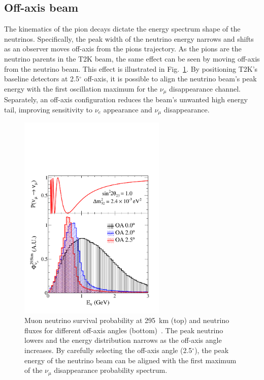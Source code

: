 \subsection{Off-axis beam}
\label{subsec:OffAxisBeam}
The kinematics of the pion decays dictate the energy spectrum shape of the neutrinos.  Specifically, the peak width of the neutrino energy narrows and shifts as an observer moves off-axis from the pions trajectory.  As the pions are the neutrino parents in the T2K beam, the same effect can be seen by moving off-axis from the neutrino beam.  This effect is illustrated in Fig.~\ref{fig:OAEffectFlux}.  By positioning T2K's baseline detectors at 2.5$^\circ$ off-axis, it is possible to align the neutrino beam's peak energy with the first oscillation maximum for the $\nu_\mu$ disappearance channel.  Separately, an off-axis configuration reduces the beam's unwanted high energy tail, improving sensitivity to $\nu_e$ appearance and $\nu_\mu$ disappearance.
\begin{figure}
  \centering
  \includegraphics[width=7cm]{images/t2k/oaeffect_flux.pdf}
  \caption{Muon neutrino survival probability at 295~km (top) and neutrino fluxes for different off-axis angles (bottom)~\cite{PhysRevD.87.012001}.  The peak neutrino lowers and the energy distribution narrows as the off-axis angle increases.  By carefully selecting the off-axis angle (2.5$^\circ$), the peak energy of the neutrino beam can be aligned with the first maximum of the $\nu_\mu$ disappearance probability spectrum.}
  \label{fig:OAEffectFlux}
\end{figure}



